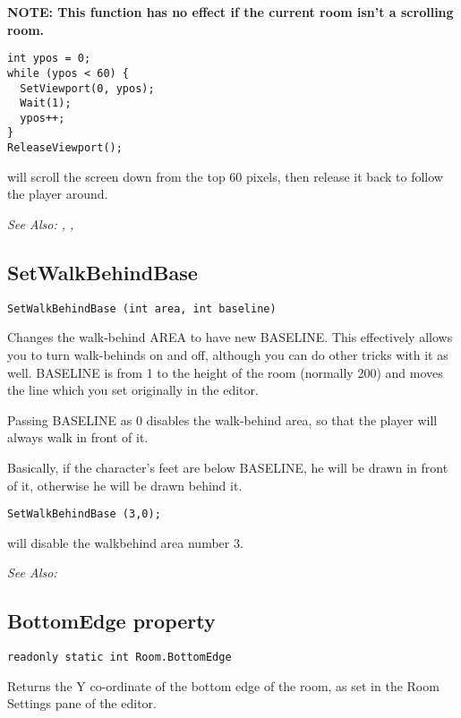 \bf{NOTE:} This function has no effect if the current room isn't a scrolling room.

\begin{verbatim}
int ypos = 0;
while (ypos < 60) {
  SetViewport(0, ypos);
  Wait(1);
  ypos++;
}
ReleaseViewport();
\end{verbatim}
will scroll the screen down from the top 60 pixels, then release it back
to follow the player around.

\it{See Also:} , , 


\subsection{SetWalkBehindBase}\label{SetWalkBehindBase}%

\begin{verbatim}
SetWalkBehindBase (int area, int baseline)
\end{verbatim}
Changes the walk-behind AREA to have new BASELINE. This effectively allows
you to turn walk-behinds on and off, although you can do other tricks with
it as well. BASELINE is from 1 to the height of the room (normally 200) and
moves the line which you set originally in the editor.

Passing BASELINE as 0 disables the walk-behind area, so that the player
will always walk in front of it.

Basically, if the character's feet are below BASELINE, he will be drawn in
front of it, otherwise he will be drawn behind it.

\begin{verbatim}
SetWalkBehindBase (3,0);
\end{verbatim}
will disable the walkbehind area number 3.

\it{See Also:} 


\subsection{BottomEdge property}\label{Room.BottomEdge}%

\begin{verbatim}
readonly static int Room.BottomEdge
\end{verbatim}
Returns the Y co-ordinate of the bottom edge of the room, as set in the Room Settings
pane of the editor.

